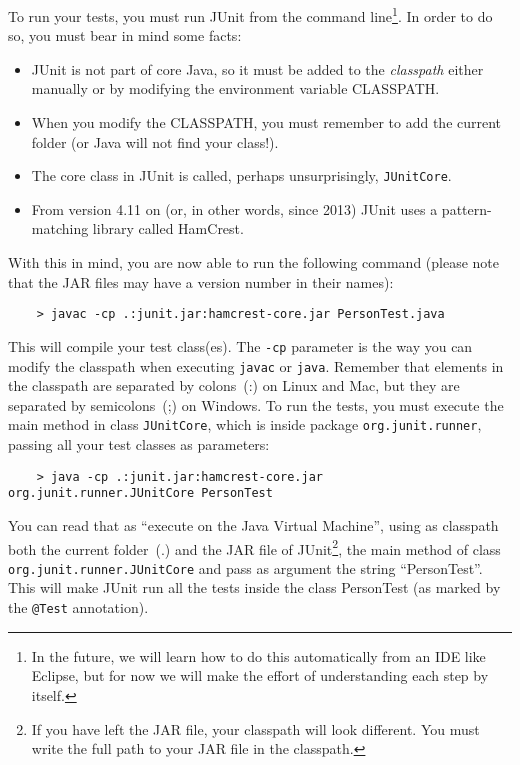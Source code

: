To run your tests, you must run JUnit from the command
line\footnote{In the future, we will learn how to do this
  automatically from an IDE like Eclipse, but for now we will make the
effort of understanding each step by itself.}. In order
to do so, you must bear in mind some facts: 

\begin{itemize}
\item JUnit is not part of core Java, so it must be added to the
  \emph{classpath} either manually or by modifying the environment
  variable CLASSPATH.
\item When you modify the CLASSPATH, you must remember to add the
  current folder (or Java will not find your class!).
\item The core class in JUnit is called, perhaps unsurprisingly,
  \verb+JUnitCore+.
\item From version 4.11 on (or, in other words, since 2013) JUnit uses
  a pattern-matching library called HamCrest. 
\end{itemize}

With this in mind, you are now able to run the following command
(please note that the JAR files may have a version number in their
names):

\begin{verbatim}
    > javac -cp .:junit.jar:hamcrest-core.jar PersonTest.java
\end{verbatim}

This will compile your test class(es). The \verb+-cp+ parameter is the
way you can modify the classpath when executing \verb+javac+ or
\verb+java+. Remember that elements in the classpath are separated by
colons~(:) on Linux and Mac, but they are separated by semicolons~(;) on
Windows. To run the tests, you must execute the main method in class
\verb+JUnitCore+, which is inside package \verb+org.junit.runner+,
passing all your test classes as parameters: 

\begin{verbatim}
    > java -cp .:junit.jar:hamcrest-core.jar org.junit.runner.JUnitCore PersonTest
\end{verbatim}

You can read that as ``execute on the Java Virtual Machine'', using as
classpath both the current folder~(.) and the JAR file of
JUnit\footnote{If you have left the JAR file, your classpath will look
different. You must write the full path to your JAR file in the
classpath.}, the
main method of class \verb+org.junit.runner.JUnitCore+ and pass as
argument the string ``PersonTest''. This will make JUnit run all the
tests inside the class PersonTest (as marked by the \verb+@Test+
annotation). 

